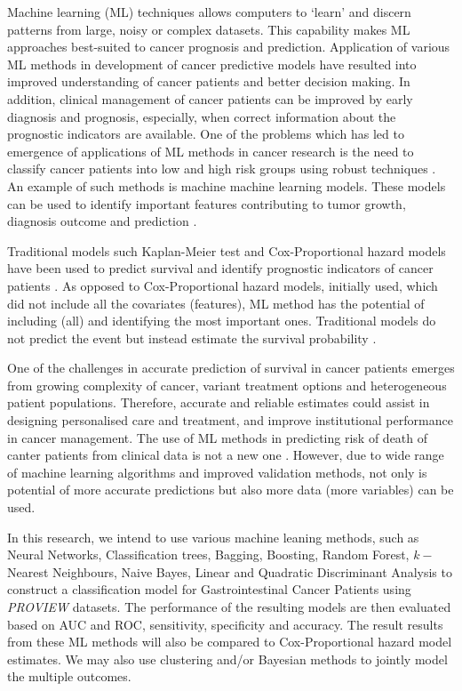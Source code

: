 Machine learning (ML) techniques allows computers to `learn' and discern patterns from large, noisy or complex datasets. This capability makes ML approaches best-suited to cancer prognosis and prediction. Application of various ML methods in development of cancer predictive models have resulted into improved understanding of cancer patients and better decision making. In addition, clinical management of cancer patients can be improved by early diagnosis and prognosis, especially, when correct information about the prognostic indicators are available. One of the problems which has led to emergence of applications of ML methods in cancer research is the need to classify cancer patients into low and high risk groups using robust techniques \cite{kourou2015machine}. An example of such methods is machine machine learning models. These models can be used to identify important features contributing to tumor growth, diagnosis outcome and prediction \citep{montazeri2016machine}.

Traditional models such Kaplan-Meier test and Cox-Proportional hazard models have been used to predict survival and identify prognostic indicators of cancer patients \citep{ganggayah2019predicting}. As opposed to Cox-Proportional hazard models, initially used, which did not include all the covariates (features), ML method has the potential of including (all) and identifying the most important ones. Traditional models do not predict the event but instead estimate the survival probability \citep{delen2005predicting}.

One of the challenges in accurate prediction of survival in cancer patients emerges from growing complexity of cancer, variant treatment options and heterogeneous patient populations. Therefore, accurate and reliable estimates could assist in designing personalised care and treatment, and improve institutional performance in cancer management. The use of ML methods in predicting risk of death of canter patients from clinical data is not a new one \citep{gupta2014machine}. However, due to wide range of machine learning algorithms and improved validation methods, not only is potential of more accurate predictions but also more data (more variables) can be used.

In this research, we intend to use various machine leaning methods, such as Neural Networks, Classification trees, Bagging, Boosting, Random Forest, $k-$Nearest Neighbours, Naive Bayes, Linear and Quadratic Discriminant Analysis to construct a classification model for Gastrointestinal Cancer Patients using \textit{PROVIEW} datasets. The performance of the resulting models are then evaluated based on AUC and ROC, sensitivity, specificity and accuracy. The result results from these ML methods will also be compared to Cox-Proportional hazard model estimates. We may also use clustering and/or Bayesian methods to jointly model the multiple outcomes.

